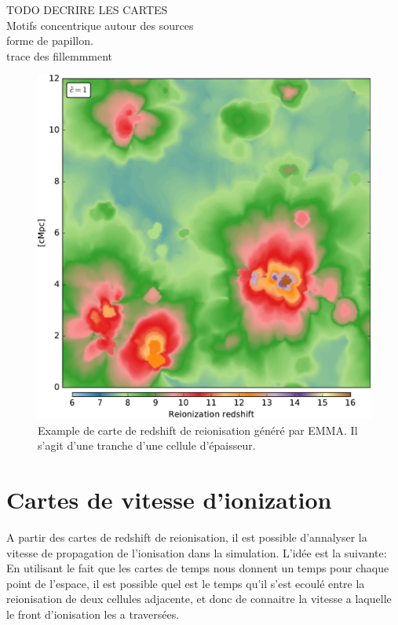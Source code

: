 TODO DECRIRE LES CARTES\\

Motifs concentrique autour des sources\\

forme de papillon.\\

trace des fillemmment\\


\begin{figure}[htpb]
        \includegraphics[width=.95\linewidth]{img/04_mapreio/map_z_c1.pdf} 
        \caption{Example de carte de redshift de reionisation généré par EMMA.
        Il s'agit d'une tranche d'une cellule d'épaisseur.
        }
 		\label{fig:zmap}
\end{figure}

\section{Cartes de vitesse d'ionization}

A partir des cartes de redshift de reionisation, il est possible d'annalyser la vitesse de propagation de l'ionisation dans la simulation.
L'idée est la suivante:
En utilisant le fait que les cartes de temps nous donnent un temps pour chaque point de l'espace, il est possible quel est le temps qu'il s'est ecoulé entre la reionisation de deux cellules adjacente, et donc de connaitre la vitesse a laquelle le front d'ionisation les a traversées.

